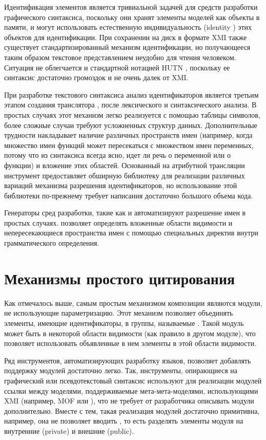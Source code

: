 Идентификация элементов является тривиальной задачей для средств разработки графического синтаксиса, поскольку они хранят элементы моделей как объекты в памяти, и могут использовать естественную индивидуальность (identity \cite{OOAD}) этих объектов для идентификации. При сохранении на диск в формате XMI \cite{XMI} также существует стандартизированный механизм идентификации, но получающееся таким образом текстовое представлением неудобно для чтения человеком. Ситуация не облегчается и стандартной нотацией HUTN \cite{HUTN}, поскольку ее синтаксис достаточно громоздок и не очень далек от XMI.

При разработке текстового синтаксиса анализ идентификаторов является третьим этапом создания транслятора \cite{DragonBook}, после лексического и синтаксического анализа. В простых случаях этот механизм легко реализуется с помощью таблицы символов, более сложные случаи требуют усложненных структур данных. Дополнительные трудности накладывает наличие различных пространств имен (например, когда множество имен функций может пересекаться с множеством имен переменных, потому что из синтаксиса всегда ясно, идет ли речь о переменной или о функции) и вложение этих областей. Основанный на атрибутной трансляции инструмент  \cite{Eli} предоставляет обширную библиотеку для реализации различных вариаций механизма разрешения идентификаторов, но использование этой библиотеки по-прежнему требует написания достаточно большого объема кода.

Генераторы сред разработки, такие как  \cite{xText} и  \cite{TCS} автоматизируют разрешение имен в простых случаях.  позволяет определять вложенные области видимости и непересекающиеся пространства имен с помощью специальных директив внутри грамматического определения. 

\section{Механизмы простого цитирования}

Как отмечалось выше, самым простым механизмом композиции являются модули, не использующие параметризацию. Этот механизм позволяет объединять элементы, имеющие идентификаторы, в группы, называемые . Такой модуль может быть  в некоторой области видимости (как правило в другом модуле), что позволяет использовать объявленные в нем элементы в этой области видимости.

Ряд инструментов, автоматизирующих разработку языков, позволяет добавлять поддержку модулей достаточно легко. Так, инструменты, опирающиеся на графический или псевдотекстовый синтаксис \cite{EMF, Fujaba, MPS} используют для реализации модулей ссылки между моделями, поддерживаемые мета-мета-моделями, использующими XMI \cite{XMI} (например, MOF или ), что не требует от разработчика описывать модули дополнительно. Вместе с тем, такая реализация модулей достаточно примитивна, например, она не позволяет вводить , то есть разделять элементы модуля на внутренние (private) и внешние (public).

